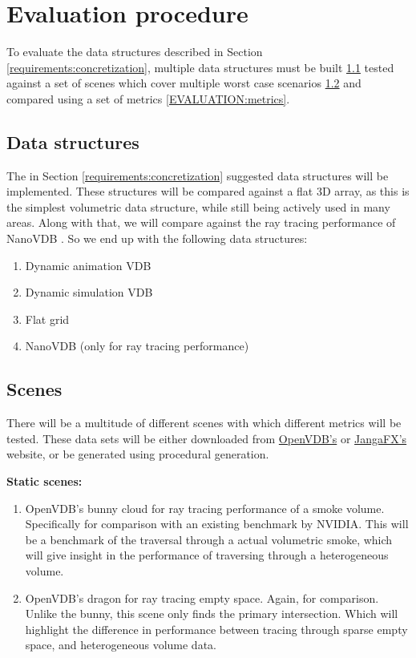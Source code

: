\section{Evaluation procedure}\label{EVALUATION}
To evaluate the data structures described in Section \ref{requirements:concretization}, multiple data structures must be built \ref{EVALUATION:data_structures} tested against a set of scenes which cover multiple worst case scenarios \ref{EVALUATION:scenes} and compared using a set of metrics \ref{EVALUATION:metrics}.

\subsection{Data structures}\label{EVALUATION:data_structures}
The in Section \ref{requirements:concretization} suggested data structures will be implemented. These structures will be compared against a flat 3D array, as this is the simplest volumetric data structure, while still being actively used in many areas. Along with that, we will compare against the ray tracing performance of NanoVDB \cite{NanoVDBBenchmark}. So we end up with the following data structures:
\begin{enumerate}
    \item Dynamic animation VDB
    \item Dynamic simulation VDB
    \item Flat grid
    \item NanoVDB (only for ray tracing performance)
\end{enumerate}


\subsection{Scenes}\label{EVALUATION:scenes}
There will be a multitude of different scenes with which different metrics will be tested. These data sets will be either downloaded from \href{https://www.openvdb.org/download/}{OpenVDB's} or \href{https://jangafx.com/software/embergen/download/free-vdb-animations/}{JangaFX's} website, or be generated using procedural generation.

\noindent\textbf{Static scenes:}
\begin{enumerate}[noitemsep,topsep=0pt,parsep=0pt,partopsep=0pt]
    \item OpenVDB's bunny cloud for ray tracing performance of a smoke volume. Specifically for comparison with an existing benchmark by NVIDIA. This will be a benchmark of the traversal through a actual volumetric smoke, which will give insight in the performance of traversing through a heterogeneous volume.
    \item OpenVDB's dragon for ray tracing empty space. Again, for comparison. Unlike the bunny, this scene only finds the primary intersection. Which will highlight the difference in performance between tracing through sparse empty space, and heterogeneous volume data.
\end{enumerate}


